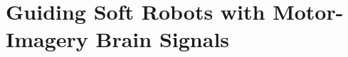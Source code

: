 \chapter{Guiding Soft Robots with Motor-Imagery Brain Signals}
\label{chp:braincontrol}

\begin{foreword}

\end{foreword}
